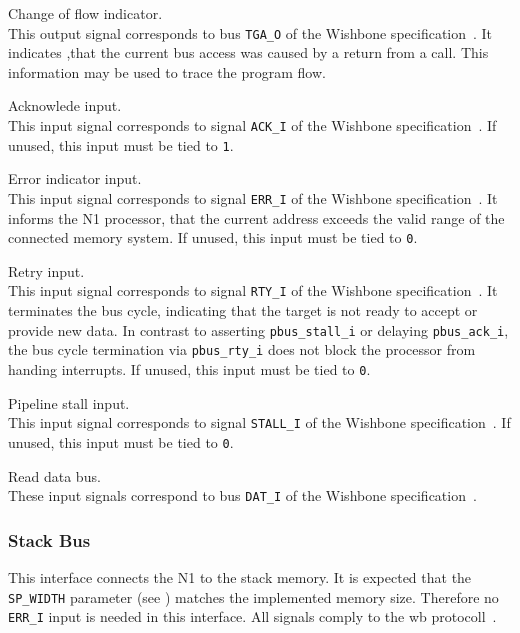 \begin{description}[style=nextline]
\item[\texttt{pbus\_tga\_cof\_eow\_o}] Change of flow indicator. \\   
  This output signal corresponds to bus \texttt{TGA\_O} of the Wishbone specification~\cite{wishbone}.
  It indicates ,that the current bus access was caused by a return from a \gls{call}.
  This information may be used to trace the program flow.

\item[\texttt{pbus\_ack\_i}] Acknowlede input. \\   
  This input signal corresponds to signal \texttt{ACK\_I} of the Wishbone specification~\cite{wishbone}.
  If unused, this input must be tied to \texttt{1}.

\item[\texttt{pbus\_err\_i}] Error indicator input. \\  
  This input signal corresponds to signal \texttt{ERR\_I} of the Wishbone specification~\cite{wishbone}.
  It informs the N1 processor, that the current address exceeds the valid range of the connected
  memory system. 
  If unused, this input must be tied to \texttt{0}.
  
\item[\texttt{pbus\_rty\_i}] Retry input. \\  
  This input signal corresponds to signal \texttt{RTY\_I} of the Wishbone specification~\cite{wishbone}.
  It terminates the bus cycle, indicating that the target is not ready to accept or provide new data.
  In contrast to asserting \texttt{pbus\_stall\_i} or delaying \texttt{pbus\_ack\_i}, the bus cycle termination
  via \texttt{pbus\_rty\_i} does not block the processor from handing interrupts.
  If unused, this input must be tied to \texttt{0}.
  
\item[\texttt{pbus\_stall\_i}] Pipeline stall input. \\
  This input signal corresponds to signal \texttt{STALL\_I} of the Wishbone specification~\cite{wishbone}.
  If unused, this input must be tied to \texttt{0}.

\item[\texttt{pbus\_dat\_i}] Read data bus. \\ 
  These input signals correspond to bus \texttt{DAT\_I} of the Wishbone specification~\cite{wishbone}.

\end{description}

\subsubsection{Stack Bus}
\label{integration:if:sbus}
This interface connects the N1 to the stack memory.
It is expected that the \texttt{SP\_WIDTH} parameter (see ) matches the
implemented memory size. Therefore no \texttt{ERR\_I} input is needed in this interface.
All signals comply to the \gls{wb} protocoll~\cite{wishbone}.

